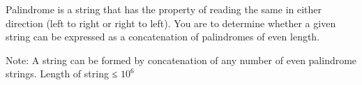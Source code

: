 Palindrome is a string that has the property of reading the same in either direction (left to right or right to left). You are to determine whether a given string can be expressed as a concatenation of palindromes of even length.  

   Note: A string can be formed by concatenation of any number of even palindrome strings.
Length of string ≤ $10^{6}$
